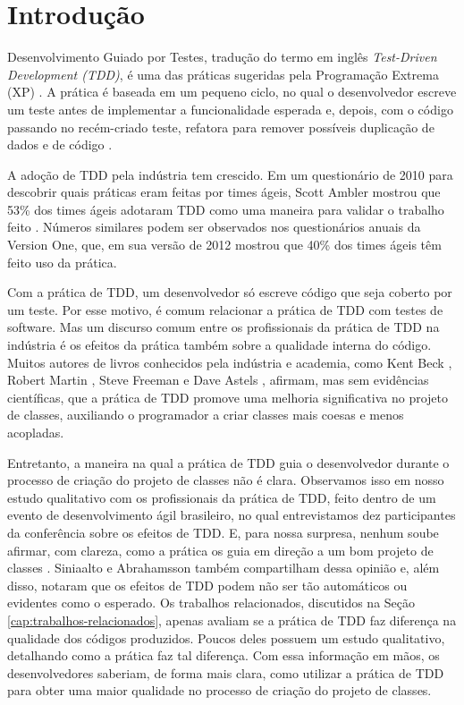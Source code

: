 \documentclass[conference]{IEEEtran}
\begin{document}

\IEEEpeerreviewmaketitle

\section{Introdução}

Desenvolvimento Guiado por Testes, tradução do termo
em inglês \textit{Test-Driven Development (TDD)},
é uma das práticas sugeridas pela Programação
Extrema (XP) \cite{XPExplained}. A prática é baseada em um pequeno ciclo, 
no qual o desenvolvedor escreve um teste antes
de implementar a funcionalidade esperada e, depois, com o código
passando no recém-criado teste, refatora para 
remover possíveis duplicação de dados e de código \cite{TDDByExample}.

A adoção de TDD pela indústria tem crescido. 
Em um questionário de 2010 para descobrir quais práticas eram feitas por times
ágeis, Scott Ambler mostrou que 53\% dos times ágeis
adotaram TDD como uma maneira para validar o trabalho feito \cite{wambler-survey-agile}.
Números similares podem ser observados nos questionários anuais da Version One, que,
em sua versão de 2012 \cite{versionone-2012} mostrou que 40\% dos times ágeis têm 
feito uso da prática.

Com a prática de TDD, um desenvolvedor só escreve código
que seja coberto por um teste. Por esse motivo, é comum relacionar a prática
de TDD com testes de software. Mas um discurso comum entre os profissionais da prática de TDD
na indústria é os efeitos da prática também sobre a qualidade interna do código.
Muitos autores de livros conhecidos pela indústria e academia, como
Kent Beck \cite{TDDByExample}, Robert Martin \cite{agile-ppp}, 
Steve Freeman \cite{GOOS} e Dave Astels \cite{astels-tdd}, afirmam, mas sem evidências científicas, 
que a prática de TDD
promove uma melhoria significativa no projeto de classes, auxiliando
o programador a criar classes mais coesas e menos acopladas.

Entretanto, a maneira na qual a prática de TDD guia o desenvolvedor
durante o processo de criação do projeto de classes não é clara. Observamos
isso em nosso estudo qualitativo com os profissionais da prática de TDD, feito dentro de um
evento de desenvolvimento ágil brasileiro, no qual entrevistamos dez
participantes da conferência sobre os efeitos de TDD. E, para nossa surpresa,
nenhum soube afirmar, com clareza, como a prática os guia em direção
a um bom projeto de classes \cite{aniche-wbma}.
Siniaalto e Abrahamsson \cite{alarming-results} também
compartilham dessa opinião e, além disso, notaram que os efeitos de TDD podem 
não ser tão automáticos ou evidentes como o esperado.
Os trabalhos relacionados, discutidos na Seção \ref{cap:trabalhos-relacionados},
apenas avaliam se a prática de TDD faz diferença na qualidade dos códigos produzidos.
Poucos deles possuem um estudo qualitativo, detalhando como a prática
faz tal diferença.
Com essa informação em mãos, os desenvolvedores saberiam, de forma mais clara,
como utilizar a prática de TDD para obter uma maior qualidade no processo de criação
do projeto de classes. 
\end{document}
